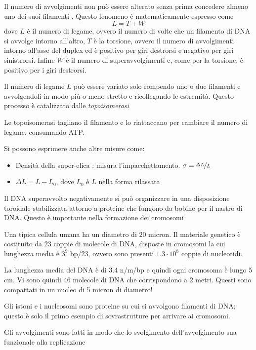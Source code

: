 Il numero di avvolgimenti non può essere alterato senza prima concedere almeno uno dei suoi filamenti . Questo fenomeno è matematicamente espresso come
\[
L = T + W
\]
dove $L$ è il numero di legame, ovvero il numero di volte che un filamento di DNA si avvolge intorno all'altro, $T$ è la torsione, ovvero il numero di avvolgimenti intorno all'asse del duplex ed è positivo per giri destrorsi e negativo per giri sinistrorsi. Infine $W$ è il numero di superavvolgimenti e, come per la torsione, è positivo per i giri destrorsi.

Il numero di legame $L$ può essere variato solo rompendo uno o due filamenti e avvolgendoli in modo più o meno stretto e ricollegando le estremità. Questo processo è catalizzato dalle \emph{topoisomerasi}

Le topoisomerasi tagliano il filamento e lo riattaccano per cambiare il numero di legame, consumando ATP.

Si possono esprimere anche altre misure come:
\begin{itemize}
\item Densità della super-elica \sigma: misura l'impacchettamento. $\sigma = \nicefrac{\Delta L}{L}$
\item $\Delta L = L - L_0$, dove $L_0$ è $L$ nella forma rilassata
\end{itemize}

Il DNA superavvolto negativamente si può organizzare in una disposizione toroidale stabilizzata attorno a proteine che fungono da bobine per il nastro di DNA. Questo è importante nella formazione dei cromosomi


Una tipica cellula umana ha un diametro di 20 micron. Il materiale genetico è costituito da 23 coppie di molecole di DNA, disposte in cromosomi la cui lunghezza media è $3^9$ bp/23, ovvero sono presenti $1.3\cdot 10^8$ coppie di nucleotidi.

La lunghezza media del DNA è di 3.4 n/m/bp e quindi ogni cromosoma è lungo 5 cm. Vi sono quindi 46 molecole di DNA che corrispondono a 2 metri. Questi sono compattati in un nucleo di 5 micron di diametro!

Gli istoni e i nucleosomi sono proteine su cui si avvolgono filamenti di DNA; questo è solo il primo esempio di sovrastrutture per arrivare ai cromosomi.

Gli avvolgimenti sono fatti in modo che lo svolgimento dell'avvolgimento sua funzionale alla replicazione

